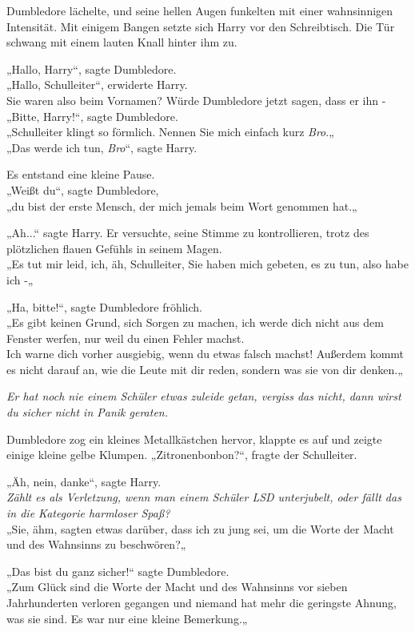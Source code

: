 {Dumbledore lächelte, und seine hellen Augen funkelten mit einer wahnsinnigen Intensität. Mit einigem Bangen setzte sich Harry vor den Schreibtisch. Die Tür schwang mit einem lauten Knall hinter ihm zu.

„Hallo, Harry“, sagte Dumbledore.\\ „Hallo, Schulleiter“, erwiderte Harry.\\ Sie waren also beim Vornamen? Würde Dumbledore jetzt sagen, dass er ihn -\\ „Bitte, Harry!“, sagte Dumbledore.\\ „Schulleiter klingt so förmlich. Nennen Sie mich einfach kurz \emph{Bro}.„\\ „Das werde ich tun, \emph{Bro}“, sagte Harry.

Es entstand eine kleine Pause.\\ „Weißt du“, sagte Dumbledore,\\ „du bist der erste Mensch, der mich jemals beim Wort genommen hat.„

„Ah...“ sagte Harry. Er versuchte, seine Stimme zu kontrollieren, trotz des plötzlichen flauen Gefühls in seinem Magen.\\ „Es tut mir leid, ich, äh, Schulleiter, Sie haben mich gebeten, es zu tun, also habe ich -„

„Ha, bitte!“, sagte Dumbledore fröhlich.\\ „Es gibt keinen Grund, sich Sorgen zu machen, ich werde dich nicht aus dem Fenster werfen, nur weil du einen Fehler machst.\\ Ich warne dich vorher ausgiebig, wenn du etwas falsch machst! Außerdem kommt es nicht darauf an, wie die Leute mit dir reden, sondern was sie von dir denken.„

\emph{Er hat noch nie einem Schüler etwas zuleide getan, vergiss das nicht, dann wirst du sicher nicht in Panik geraten.}

Dumbledore zog ein kleines Metallkästchen hervor, klappte es auf und zeigte einige kleine gelbe Klumpen. „Zitronenbonbon?“, fragte der Schulleiter.

„Äh, nein, danke“, sagte Harry.\\ \emph{Zählt es als Verletzung, wenn man einem Schüler LSD unterjubelt, oder fällt das in die Kategorie harmloser Spaß?}\\ „Sie, ähm, sagten etwas darüber, dass ich zu jung sei, um die Worte der Macht und des Wahnsinns zu beschwören?„

„Das bist du ganz sicher!“ sagte Dumbledore.\\ „Zum Glück sind die Worte der Macht und des Wahnsinns vor sieben Jahrhunderten verloren gegangen und niemand hat mehr die geringste Ahnung, was sie sind. Es war nur eine kleine Bemerkung.„

}
